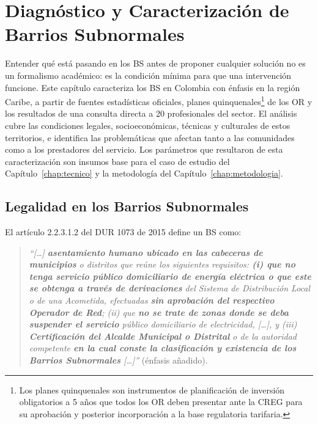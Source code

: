 
\chapter{Diagnóstico y Caracterización de Barrios Subnormales}
\label{chap:diagnostico}

Entender qué está pasando en los BS antes de proponer cualquier solución no es un formalismo académico: es la condición mínima para que una intervención funcione. Este capítulo caracteriza los BS en Colombia con énfasis en la región Caribe, a partir de fuentes estadísticas oficiales, planes quinquenales\footnote{Los planes quinquenales son instrumentos de planificación de inversión obligatorios a 5 años que todos los OR deben presentar ante la CREG para su aprobación y posterior incorporación a la base regulatoria tarifaria.} de los OR y los resultados de una consulta directa a 20 profesionales del sector. El análisis cubre las condiciones legales, socioeconómicas, técnicas y culturales de estos territorios, e identifica las problemáticas que afectan tanto a las comunidades como a los prestadores del servicio. Los parámetros que resultaron de esta caracterización son insumos base para el caso de estudio del Capítulo~\ref{chap:tecnico} y la metodología del Capítulo~\ref{chap:metodologia}.


\section{Legalidad en los Barrios Subnormales}
\label{sec:legalidad}

El artículo 2.2.3.1.2 del DUR 1073 de 2015 define un BS como:

\begin{quote}
\textit{``[\ldots] \textbf{asentamiento humano ubicado en las cabeceras de municipios} o distritos que reúne los siguientes requisitos: \textbf{(i) que no tenga servicio público domiciliario de energía eléctrica o que este se obtenga a través de derivaciones} del Sistema de Distribución Local o de una Acometida, efectuadas \textbf{sin aprobación del respectivo Operador de Red}; (ii) que \textbf{no se trate de zonas donde se deba suspender el servicio} público domiciliario de electricidad, [\ldots], y (iii) \textbf{Certificación del Alcalde Municipal o Distrital} o de la autoridad competente \textbf{en la cual conste la clasificación y existencia de los Barrios Subnormales} [\ldots]''}
\parencite{DUR1073_2015} (énfasis añadido).
\end{quote}


